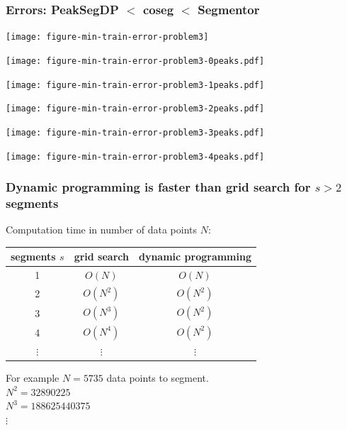 \documentclass{beamer}
\begin{document}
\begin{frame}
  \frametitle{Errors: PeakSegDP $<$ coseg $<$ Segmentor}
  \texttt{[image: figure-min-train-error-problem3]}
\end{frame}

\begin{frame}
  \texttt{[image: figure-min-train-error-problem3-0peaks.pdf]}
\end{frame}

\begin{frame}
  \texttt{[image: figure-min-train-error-problem3-1peaks.pdf]}
\end{frame}

\begin{frame}
  \texttt{[image: figure-min-train-error-problem3-2peaks.pdf]}
\end{frame}

\begin{frame}
  \texttt{[image: figure-min-train-error-problem3-3peaks.pdf]}
\end{frame}

\begin{frame}
  \texttt{[image: figure-min-train-error-problem3-4peaks.pdf]}
\end{frame}








\begin{frame}
  \frametitle{Dynamic programming is faster than grid search for $s>
    2$ segments}

  Computation time in number of data points $N$:

  \vskip 1cm

  \begin{tabular}{ccc}
    segments $s$ & grid search & dynamic programming \\
    \hline
    1 & $O(N)$ & $O(N)$ \\
    2 & $O(N^2)$ & $O(N^2)$ \\
    3 & $O(N^3)$ & $O(N^2)$ \\
    4 & $O(N^4)$ & $O(N^2)$ \\
    $\vdots$ &     $\vdots$ &     $\vdots$ 
  \end{tabular}

  \vskip 1cm

  For example $N = 5735$ data points to segment.\\
  $N^2 = 32890225$\\
  $N^3 = 188625440375$\\
  $\vdots$
\end{frame}


\end{document}
